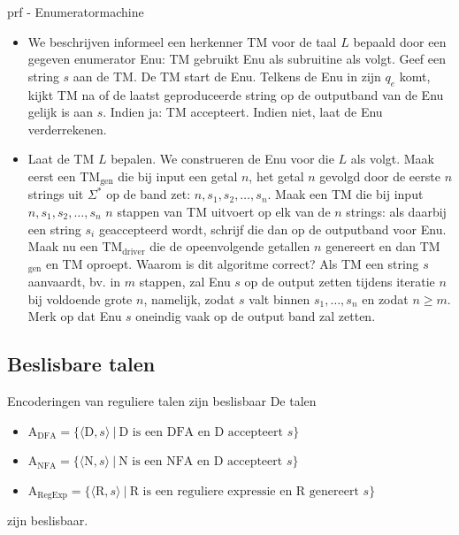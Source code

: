 \begin{prf}[Enumeratormachine]{prf - Enumeratormachine}
    \vspace{-0.15cm}
    \begin{itemize}
        \item 
            We beschrijven informeel een herkenner TM voor de taal $L$ bepaald door een gegeven enumerator Enu: TM gebruikt Enu als subruitine als volgt. Geef een string $s$ aan de TM\@. De TM start de Enu. Telkens de Enu in zijn $q_e$ komt, kijkt TM na of de laatst geproduceerde string op de outputband van de Enu gelijk is aan $s$. Indien ja: TM accepteert. Indien niet, laat de Enu verderrekenen.
        \item 
            Laat de TM $L$ bepalen. We construeren de Enu voor die $L$ als volgt. Maak eerst een TM$_{\text{gen}}$ die bij input een getal $n$, het getal $n$ gevolgd door de eerste $n$ strings uit $\Sigma^*$ op de band zet: $n, s_1, s_2, \dots, s_n$. Maak een TM die bij input $n, s_1, s_2, \dots, s_n$ $n$ stappen van TM uitvoert op elk van de $n$ strings: als daarbij een string $s_i$ geaccepteerd wordt, schrijf die dan op de outputband voor Enu. Maak nu een TM$_{\text{driver}}$ die de opeenvolgende getallen $n$ genereert en dan TM$_{\text{gen}}$ en TM oproept.
            Waarom is dit algoritme correct? Als TM een string $s$ aanvaardt, bv\@. in $m$ stappen, zal Enu $s$ op de output zetten tijdens iteratie $n$ bij voldoende grote $n$, namelijk, zodat $s$ valt binnen $s_1,\ldots,s_n$ en zodat $n \geq m$. Merk op dat Enu $s$ oneindig vaak op de output band zal zetten.
    \end{itemize}
    \vspace{-0.3cm}
\end{prf}


\subsection{Beslisbare talen}

\vspace{0.2cm}

\begin{lem}{Encoderingen van reguliere talen zijn beslisbaar}
    \vspace{-0.1cm}
    De talen
    \begin{itemize}
        \item 
            A$_{\text{DFA}} = \{\langle \text{D}, s\rangle\  | \ \text{D is een DFA en D accepteert $s$} \}$
        \item 
            A$_{\text{NFA}} = \{\langle \text{N}, s\rangle\  | \ \text{N is een NFA en D accepteert $s$} \}$
        \item 
            A$_{\text{RegExp}} = \{\langle \text{R}, s\rangle\  | \ \text{R is een reguliere expressie en R genereert $s$} \}$
    \end{itemize}
    zijn beslisbaar.
    \vspace{-0.1cm}
\end{lem}

